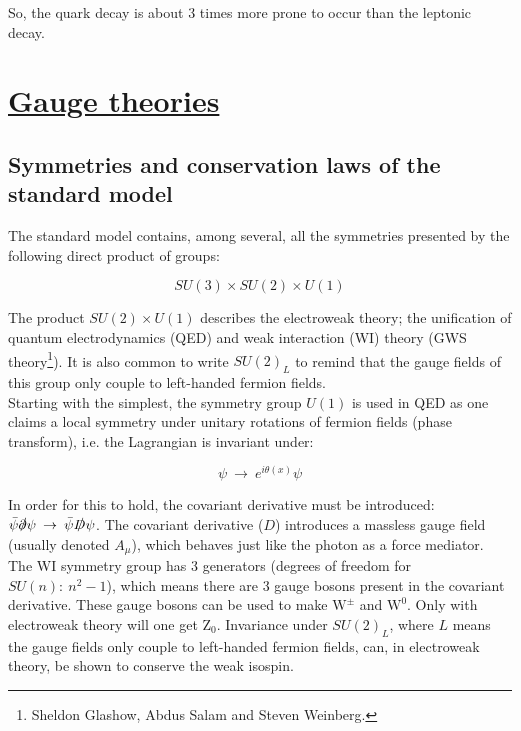 \documentclass[11pt,a4paper]{article}
\begin{document}
So, the quark decay is about 3 times more prone to occur than the leptonic decay.

\section{\underline{Gauge theories}}
\subsection{Symmetries and conservation laws of the standard model}
The standard model contains, among several, all the symmetries presented by the following direct product of groups:

\begin{equation}
	SU(3) \times SU(2) \times U(1)
\end{equation}

The product $SU(2) \times U(1)$ describes the electroweak theory; the unification of quantum electrodynamics (QED) and weak interaction (WI) theory (GWS theory\footnote{Sheldon Glashow, Abdus Salam and Steven Weinberg.}). It is also common to write $SU(2)_L$ to remind that the gauge fields of this group only couple to left-handed fermion fields.\\

Starting with the simplest, the symmetry group $U(1)$ is used in QED as one claims a local symmetry under unitary rotations of fermion fields (phase transform), i.e. the Lagrangian is invariant under:

\begin{equation}
	\psi \:\rightarrow\: e^{i\theta(x)}\psi
\end{equation} 

In order for this to hold, the covariant derivative must be introduced: $\bar{\psi}\slashed\partial\psi \:\rightarrow\: \bar{\psi}\slashed D\psi$. The covariant derivative ($D$) introduces a massless gauge field (usually denoted $A_\mu$), which behaves just like the photon as a force mediator.\\

The WI symmetry group has 3 generators (degrees of freedom for $SU(n):\:n^2-1$), which means there are 3 gauge bosons present in the covariant derivative. These gauge bosons can be used to make $\text{W}^\pm$ and $\text{W}^0$. Only with electroweak theory will one get $\text{Z}_ 0$. Invariance under $SU(2)_L$, where $L$ means the gauge fields only couple to left-handed fermion fields, can, in electroweak theory, be shown to conserve the weak isospin.\\
\end{document}
